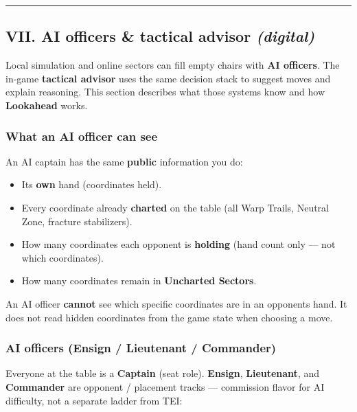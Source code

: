 \documentclass[11pt]{article}
\providecommand{\tightlist}{%
  \setlength{\itemsep}{0pt}\setlength{\parskip}{0pt}}
\begin{document}
\begin{center}\rule{0.5\linewidth}{0.5pt}\end{center}

\subsection{\texorpdfstring{VII. AI officers \& tactical advisor
\emph{(digital)}}{VII. AI officers \& tactical advisor (digital)}}\label{vii-ai-officers--tactical-advisor-digital}

Local simulation and online sectors can fill empty chairs with
\textbf{AI officers}. The in-game \textbf{tactical advisor} uses the
same decision stack to suggest moves and explain reasoning. This section
describes what those systems know and how \textbf{Lookahead} works.

\subsubsection{What an AI officer can
see}\label{what-an-ai-officer-can-see}

An AI captain has the same \textbf{public} information you do:

\begin{itemize}
\tightlist
\item
  Its \textbf{own} hand (coordinates held).
\item
  Every coordinate already \textbf{charted} on the table (all Warp
  Trails, Neutral Zone, fracture stabilizers).
\item
  How many coordinates each opponent is \textbf{holding} (hand count only ---
  not which coordinates).
\item
  How many coordinates remain in \textbf{Uncharted Sectors}.
\end{itemize}

An AI officer \textbf{cannot} see which specific coordinates are in an
opponent\textquotesingle s hand. It does not read hidden coordinates from the
game state when choosing a move.

\subsubsection{AI officers (Ensign / Lieutenant /
Commander)}\label{ai-officers-ensign--lieutenant--commander}

Everyone at the table is a \textbf{Captain} (seat role).
\textbf{Ensign}, \textbf{Lieutenant}, and \textbf{Commander} are
opponent / placement tracks --- commission flavor for AI difficulty, not
a separate ladder from TEI:
\end{document}
